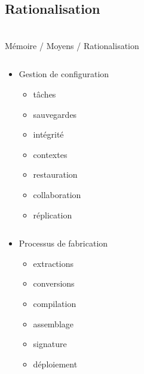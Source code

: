 \subsection{Rationalisation}\begin{frame}
{\bititle\\Mémoire / Moyens / Rationalisation}
\begin{columns}\begin{column}{.5\textwidth}
\begin{itemize}
\item<1-> Gestion de configuration
    \begin{itemize}
    \item<2-> tâches
    \item<3-> sauvegardes
    \item<4-> intégrité
    \item<5-> contextes
    \item<6-> restauration
    \item<7-> collaboration
    \item<8-> réplication
    \end{itemize}
\end{itemize}
\end{column}\begin{column}{.5\textwidth}
\end{column}\end{columns}
\begin{columns}\begin{column}{.5\textwidth}
\begin{itemize}
\item<9-> Processus de fabrication
    \begin{itemize}
    \item<10-> extractions
    \item<11-> conversions
    \item<12-> compilation
    \item<13-> assemblage
    \item<14-> signature
    \item<15-> déploiement
    \end{itemize}
\end{itemize}
\end{column}\begin{column}{.5\textwidth}

\end{column}\end{columns}
\end{frame}
